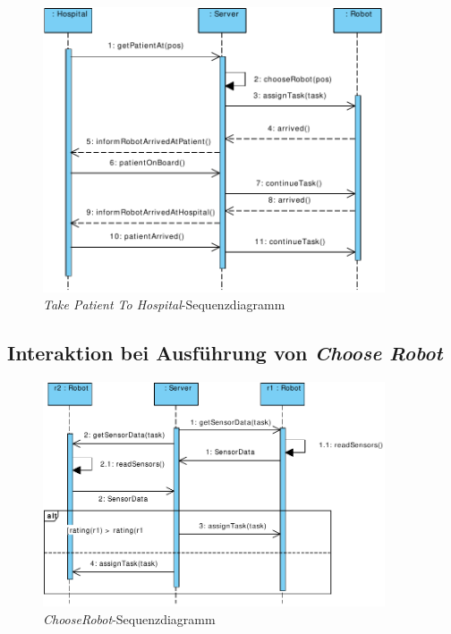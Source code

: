 \begin{figure}[H]
	\centering
	\includegraphics[width=0.9\textwidth]{img/1-Analyse-2-TakePatientToHospital}
	\caption{\emph{Take Patient To Hospital}-Sequenzdiagramm}
	\label{SequenzDiagrammInteraktion}
\end{figure}

\subsection*{Interaktion bei Ausführung von \emph{Choose Robot}}


\begin{figure}[H]
	\centering
	\includegraphics[width=0.9\textwidth]{img/0-Entwurf-2-ChooseRob}
	\caption{\emph{ChooseRobot}-Sequenzdiagramm}
	\label{SequenzDiagrammInteraktion}
\end{figure}
